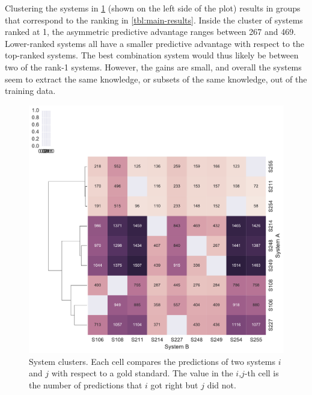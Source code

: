\documentclass[11pt,letterpaper]{article}
\begin{document}
Clustering the systems in \cref{fig:system-clusters} (shown on the left side of the plot) 
results in groups that correspond to the ranking in \cref{tbl:main-results}. 
Inside the cluster of systems ranked at 1, the asymmetric predictive advantage ranges between 267 and 469. 
Lower-ranked systems all have a smaller predictive advantage with respect to the top-ranked systems. 
The best combination system would thus likely be between two of the rank-1 systems. 
However, the gains are small, and overall the systems seem to extract the same knowledge, 
or subsets of the same knowledge, out of the training data. 






\begin{figure}
	\includegraphics[width=\columnwidth]{figs/system_pairwise_clusters_cropped.pdf}
	\caption{System clusters. Each cell compares the predictions of two systems $i$ and $j$ with respect to a gold standard. The value in the $i$,$j$-th cell is the number of predictions that $i$ got right but $j$ did not.}
	\label{fig:system-clusters}
\end{figure}
\end{document}
